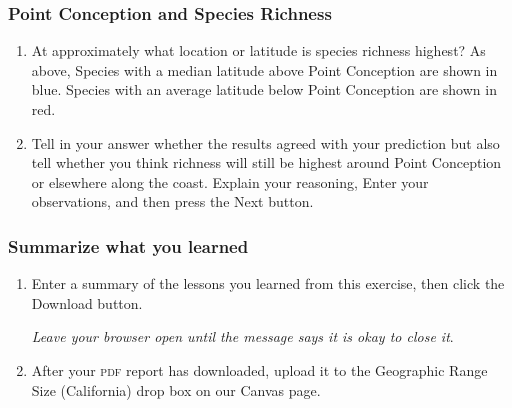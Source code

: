 \documentclass[11pt]{article}
\begin{document}
\subsubsection*{Point Conception and Species Richness}


\begin{enumerate}[resume]
	
	\item At approximately what location or latitude is species richness highest? As above, Species with a median latitude above Point Conception are shown in blue. Species with an average latitude below Point Conception are shown in red.
	
	\item Tell in your answer whether the results agreed with your prediction but also tell whether you think richness will still be highest around Point Conception or elsewhere along the coast. Explain your reasoning, Enter your observations, and then press the Next button.

\end{enumerate}

\subsubsection*{Summarize what you learned}

\begin{enumerate}[resume]
	
	\item Enter a summary of the lessons you learned from this exercise, then click the Download button.
	
	\emph{Leave your browser open until the message says it is okay to close it}.
	
	\item After your \textsc{pdf} report has downloaded,  upload it to the Geographic Range Size (California) drop box on our Canvas page.
\end{enumerate}
\end{document}
